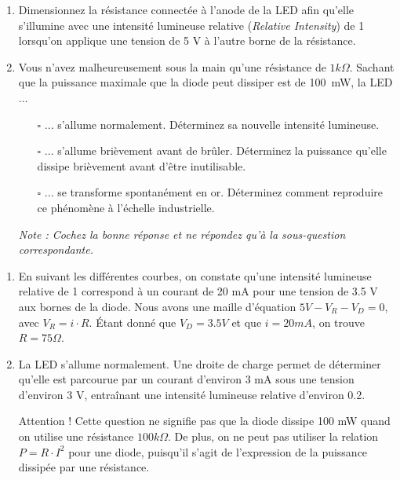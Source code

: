 \documentclass{../template/tp}
\begin{document}
\Question
{
\begin{enumerate}
\item Dimensionnez la résistance connectée à l'anode de la LED afin qu'elle s'illumine avec une intensité lumineuse relative (\textit{Relative Intensity}) de 1 lorsqu'on applique une tension de 5 V à l'autre borne de la résistance.

\item Vous n'avez malheureusement sous la main qu'une résistance de $1 k\Omega$.
Sachant que la puissance maximale que la diode peut dissiper est de 100~mW, la LED ...
    \begin{itemize}
    \item[$\square$]... s'allume normalement. Déterminez sa nouvelle intensité lumineuse.
    \item[$\square$]... s'allume brièvement avant de brûler. Déterminez la puissance qu'elle dissipe brièvement avant d'être inutilisable.
    \item[$\square$]... se transforme spontanément en or. Déterminez comment reproduire ce phénomène à l'échelle industrielle.
    \end{itemize}
\textit{Note : Cochez la bonne réponse et ne répondez qu'à la sous-question correspondante.}
\end{enumerate}

}
{
\begin{enumerate}
\item En suivant les différentes courbes, on constate qu'une intensité lumineuse relative de 1 correspond à un courant de 20 mA pour une tension de 3.5 V aux bornes de la diode.
Nous avons une maille d'équation $5V - V_R - V_D = 0$, avec $V_R = i \cdot R$. Étant donné que $V_D = 3.5 V$ et que $i = 20 mA$, on trouve $R = 75 \Omega$.

\item La LED s'allume normalement. Une droite de charge permet de déterminer qu'elle est parcourue par un courant d'environ 3 mA sous une tension d'environ 3 V, entraînant une intensité lumineuse relative d'environ 0.2.

Attention ! Cette question ne signifie pas que la diode dissipe 100 mW quand on utilise une résistance $100 k\Omega$.
De plus, on ne peut pas utiliser la relation $P = R\cdot I^2$ pour une diode, puisqu'il s'agit de l'expression de la puissance dissipée par une résistance.
\end{enumerate}
}

\clearpage
\end{document}
